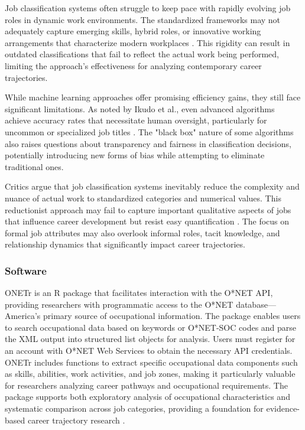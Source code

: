 \documentclass[../main.tex]{subfiles}
\begin{document}
Job classification systems often struggle to keep pace with rapidly evolving job roles in dynamic work environments. The standardized frameworks may not adequately capture emerging skills, hybrid roles, or innovative working arrangements that characterize modern workplaces \parencite{deel2024}. This rigidity can result in outdated classifications that fail to reflect the actual work being performed, limiting the approach's effectiveness for analyzing contemporary career trajectories.

While machine learning approaches offer promising efficiency gains, they still face significant limitations. As noted by Ikudo et al., even advanced algorithms achieve accuracy rates that necessitate human oversight, particularly for uncommon or specialized job titles \parencite{ikudo2018}. The "black box" nature of some algorithms also raises questions about transparency and fairness in classification decisions, potentially introducing new forms of bias while attempting to eliminate traditional ones.

Critics argue that job classification systems inevitably reduce the complexity and nuance of actual work to standardized categories and numerical values. This reductionist approach may fail to capture important qualitative aspects of jobs that influence career development but resist easy quantification \parencite{jeesr2021}. The focus on formal job attributes may also overlook informal roles, tacit knowledge, and relationship dynamics that significantly impact career trajectories.

\subsubsection{Software}

ONETr is an R package that facilitates interaction with the O*NET API, providing researchers with programmatic access to the O*NET database—America's primary source of occupational information. The package enables users to search occupational data based on keywords or O*NET-SOC codes and parse the XML output into structured list objects for analysis. Users must register for an account with O*NET Web Services to obtain the necessary API credentials. ONETr includes functions to extract specific occupational data components such as skills, abilities, work activities, and job zones, making it particularly valuable for researchers analyzing career pathways and occupational requirements. The package supports both exploratory analysis of occupational characteristics and systematic comparison across job categories, providing a foundation for evidence-based career trajectory research \parencite{onetr2024}.
\end{document}
